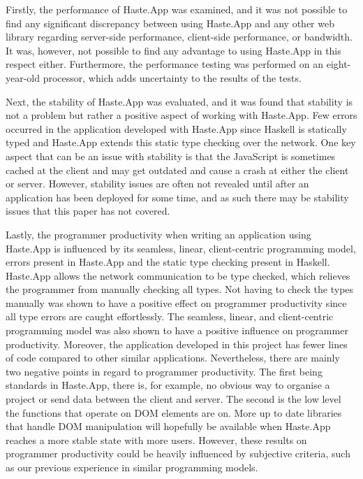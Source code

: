 \documentclass[a4paper]{article}
\begin{document}
Firstly, the performance of Haste.App was examined, and it was not possible to find any significant discrepancy between using Haste.App and any other web library regarding server-side performance, client-side performance, or bandwidth. It was, however, not possible to find any advantage to using Haste.App in this respect either. Furthermore, the performance testing was performed on an eight-year-old processor, which adds uncertainty to the results of the tests.

Next, the stability of Haste.App was evaluated, and it was found that stability is not a problem but rather a positive aspect of working with Haste.App. Few errors occurred in the application developed with Haste.App since Haskell is statically typed and Haste.App extends this static type checking over the network. One key aspect that can be an issue with stability is that the JavaScript is sometimes cached at the client and may get outdated and cause a crash at either the client or server. However, stability issues are often not revealed until after an application has been deployed for some time, and as such there may be stability issues that this paper has not covered.

Lastly, the programmer productivity when writing an application using Haste.App is influenced by its seamless, linear, client-centric programming model, errors present in Haste.App and the static type checking present in Haskell. Haste.App allows the network communication to be type checked, which relieves the programmer from manually checking all types. Not having to check the types manually was shown to have a positive effect on programmer productivity since all type errors are caught effortlessly. The seamless, linear, and client-centric programming model was also shown to have a positive influence on programmer productivity. Moreover, the application developed in this project has fewer lines of code compared to other similar applications. Nevertheless, there are mainly two negative points in regard to programmer productivity. The first being standards in Haste.App, there is, for example, no obvious way to organise a project or send data between the client and server. The second is the low level the functions that operate on DOM elements are on. More up to date libraries that handle DOM manipulation will hopefully be available when Haste.App reaches a more stable state with more users. However, these results on programmer productivity could be heavily influenced by subjective criteria, such as our previous experience in similar programming models.
\end{document}
